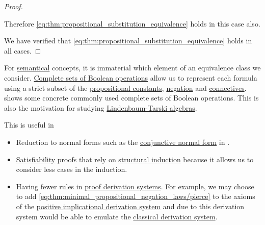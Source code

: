 \begin{proof}
\begin{itemize}
    Therefore \eqref{eq:thm:propositional_substitution_equivalence} holds in this case also.
  \end{itemize}

  We have verified that \eqref{eq:thm:propositional_substitution_equivalence} holds in all cases.
\end{proof}

\begin{remark}\label{rem:smaller_propositional_language}
  For \hyperref[def:propositional_semantics]{semantical} concepts, it is immaterial which element of an equivalence class we consider. \hyperref[def:boolean_closure]{Complete sets of Boolean operations} allow us to represent each formula using a strict subset of the \hyperref[def:propositional_language/constants]{propositional constants}, \hyperref[def:propositional_language/negation]{negation} and \hyperref[def:propositional_language/connectives]{connectives}.  shows some concrete commonly used complete sets of Boolean operations. This is also the motivation for studying \hyperref[def:lindenbaum_tarski_algebra]{Lindenbaum-Tarski algebras}.

  This is useful in
  \begin{itemize}
    \item Reduction to normal forms such as the \hyperref[def:conjunctive_disjunctive_normal_form]{conjunctive normal form} in .

    \item \hyperref[def:propositional_semantics/satisfiability]{Satisfiability} proofs that rely on \hyperref[rem:induction]{structural induction} because it allows us to consider less cases in the induction.

    \item Having fewer rules in \hyperref[alg:conjunctive_normal_form_reduction]{proof derivation systems}. For example, we may choose to add \eqref{eq:thm:minimal_propositional_negation_laws/pierce} to the axioms of the \hyperref[def:positive_implicational_propositional_derivation_system]{positive implicational derivation system} and due to  this derivation system would be able to emulate the \hyperref[def:propositional_derivation_system]{classical derivation system}.
  \end{itemize}
\end{remark}

